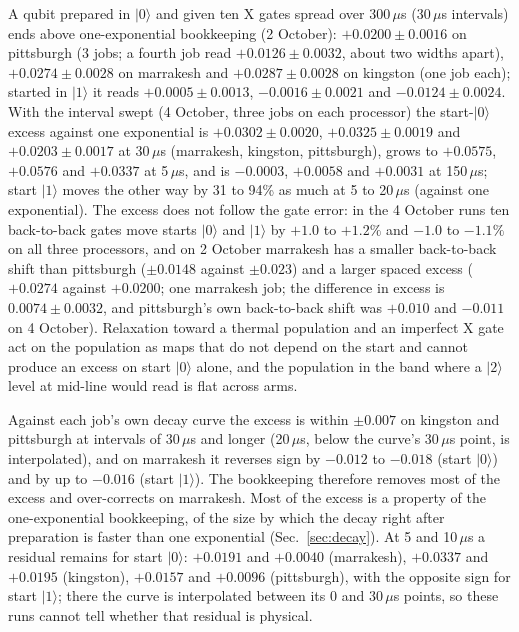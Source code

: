 \documentclass[reprint,amsmath,amssymb,aps,superscriptaddress,nofootinbib]{revtex4-2}
\newcommand{\us}{\,$\mu$s}
\begin{document}
A qubit prepared in $|0\rangle$ and given ten X gates spread over 300\us{} (30\us{} intervals) ends above one-exponential bookkeeping (2 October): $+0.0200\pm0.0016$ on pittsburgh (3 jobs; a fourth job read $+0.0126\pm0.0032$, about two widths apart), $+0.0274\pm0.0028$ on marrakesh and $+0.0287\pm0.0028$ on kingston (one job each); started in $|1\rangle$ it reads $+0.0005\pm0.0013$, $-0.0016\pm0.0021$ and $-0.0124\pm0.0024$. With the interval swept (4 October, three jobs on each processor) the start-$|0\rangle$ excess against one exponential is $+0.0302\pm0.0020$, $+0.0325\pm0.0019$ and $+0.0203\pm0.0017$ at 30\us{} (marrakesh, kingston, pittsburgh), grows to $+0.0575$, $+0.0576$ and $+0.0337$ at 5\us, and is $-0.0003$, $+0.0058$ and $+0.0031$ at 150\us; start $|1\rangle$ moves the other way by 31 to 94\% as much at 5 to 20\us{} (against one exponential). The excess does not follow the gate error: in the 4 October runs ten back-to-back gates move starts $|0\rangle$ and $|1\rangle$ by $+1.0$ to $+1.2\%$ and $-1.0$ to $-1.1\%$ on all three processors, and on 2 October marrakesh has a smaller back-to-back shift than pittsburgh ($\pm0.0148$ against $\pm0.023$) and a larger spaced excess ($+0.0274$ against $+0.0200$; one marrakesh job; the difference in excess is $0.0074\pm0.0032$, and pittsburgh's own back-to-back shift was $+0.010$ and $-0.011$ on 4 October). Relaxation toward a thermal population and an imperfect X gate act on the population as maps that do not depend on the start and cannot produce an excess on start $|0\rangle$ alone, and the population in the band where a $|2\rangle$ level at mid-line would read is flat across arms.

Against each job's own decay curve the excess is within $\pm0.007$ on kingston and pittsburgh at intervals of 30\us{} and longer (20\us{}, below the curve's 30\us{} point, is interpolated), and on marrakesh it reverses sign by $-0.012$ to $-0.018$ (start $|0\rangle$) and by up to $-0.016$ (start $|1\rangle$). The bookkeeping therefore removes most of the excess and over-corrects on marrakesh. Most of the excess is a property of the one-exponential bookkeeping, of the size by which the decay right after preparation is faster than one exponential (Sec.~\ref{sec:decay}). At 5 and 10\us{} a residual remains for start $|0\rangle$: $+0.0191$ and $+0.0040$ (marrakesh), $+0.0337$ and $+0.0195$ (kingston), $+0.0157$ and $+0.0096$ (pittsburgh), with the opposite sign for start $|1\rangle$; there the curve is interpolated between its 0 and 30\us{} points, so these runs cannot tell whether that residual is physical.
\end{document}
